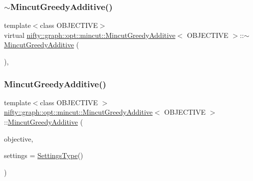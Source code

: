 \subsubsection{\texorpdfstring{$\sim$\+Mincut\+Greedy\+Additive()}{~MincutGreedyAdditive()}}
{\footnotesize\ttfamily template$<$class O\+B\+J\+E\+C\+T\+I\+VE$>$ \\
virtual \hyperlink{classnifty_1_1graph_1_1opt_1_1mincut_1_1MincutGreedyAdditive}{nifty\+::graph\+::opt\+::mincut\+::\+Mincut\+Greedy\+Additive}$<$ O\+B\+J\+E\+C\+T\+I\+VE $>$\+::$\sim$\hyperlink{classnifty_1_1graph_1_1opt_1_1mincut_1_1MincutGreedyAdditive}{Mincut\+Greedy\+Additive} (\begin{DoxyParamCaption}{ }\end{DoxyParamCaption})\hspace{0.3cm}{\ttfamily [inline]}, {\ttfamily [virtual]}}

\mbox{\label{classnifty_1_1graph_1_1opt_1_1mincut_1_1MincutGreedyAdditive_a65fff86234d1c749a4355557a80b40a4}} 
\subsubsection{\texorpdfstring{Mincut\+Greedy\+Additive()}{MincutGreedyAdditive()}}
{\footnotesize\ttfamily template$<$class O\+B\+J\+E\+C\+T\+I\+VE $>$ \\
\hyperlink{classnifty_1_1graph_1_1opt_1_1mincut_1_1MincutGreedyAdditive}{nifty\+::graph\+::opt\+::mincut\+::\+Mincut\+Greedy\+Additive}$<$ O\+B\+J\+E\+C\+T\+I\+VE $>$\+::\hyperlink{classnifty_1_1graph_1_1opt_1_1mincut_1_1MincutGreedyAdditive}{Mincut\+Greedy\+Additive} (\begin{DoxyParamCaption}\item[{const \hyperlink{classnifty_1_1graph_1_1opt_1_1mincut_1_1MincutGreedyAdditive_a1e4f0fc6675ac7d977619126bfd6e143}{Objective\+Type} \&}]{objective,  }\item[{const \hyperlink{classnifty_1_1graph_1_1opt_1_1mincut_1_1MincutGreedyAdditive_acc6768ee2aa88a457488451751bd4aac}{Settings\+Type} \&}]{settings = {\ttfamily \hyperlink{classnifty_1_1graph_1_1opt_1_1mincut_1_1MincutGreedyAdditive_acc6768ee2aa88a457488451751bd4aac}{Settings\+Type}()} }\end{DoxyParamCaption})}



